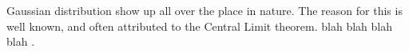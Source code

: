 Gaussian distribution show up all over the place in nature.
The reason for this is well known,
and often attributed to the Central Limit theorem. blah blah blah blah
\cite{clt}.

